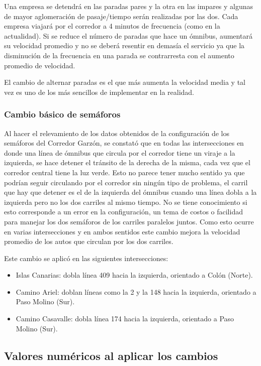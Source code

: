 Una empresa se detendrá en las paradas pares y la otra en las impares y algunas de mayor aglomeración de pasaje/tiempo serán realizadas por las dos. Cada empresa viajará por el corredor a 4 minutos de frecuencia (como en la actualidad). Si se reduce el número de paradas que hace un ómnibus, aumentará su velocidad promedio y no se deberá resentir en demasía el servicio ya que la disminución de la frecuencia en una parada se contrarresta con el aumento promedio de velocidad.

El cambio de alternar paradas es el que más aumenta la velocidad media y tal vez es uno de los más sencillos de implementar en la realidad.



\subsubsection{Cambio básico de semáforos}
Al hacer el relevamiento de los datos obtenidos de la configuración de los semáforos del Corredor Garzón, se constató que en todas las intersecciones en donde una línea de ómnibus que circula por el corredor tiene un viraje a la izquierda, se hace detener el tránsito de la derecha de la misma, cada vez que el corredor central tiene la luz verde. Esto no parece tener mucho sentido ya que podrían seguir circulando por el corredor sin ningún tipo de problema, el carril que hay que detener es el de la izquierda del ómnibus cuando una línea dobla a la izquierda pero no los dos carriles al mismo tiempo. No se tiene conocimiento si esto corresponde a un error en la configuración, un tema de costos o facilidad para manejar los dos semáforos de los carriles paralelos juntos. Como esto ocurre en varias intersecciones y en ambos sentidos este cambio mejora la velocidad promedio de los autos que circulan por los dos carriles.

Este cambio se aplicó en las siguientes intersecciones:
\begin{itemize}
	\item Islas Canarias: dobla línea 409 hacia la izquierda, orientado a Colón (Norte).
	\item Camino Ariel: doblan líneas como la  2 y la 148 hacia la izquierda, orientado a Paso Molino (Sur). 
	\item Camino Casavalle: dobla línea 174 hacia la izquierda, orientado a Paso Molino (Sur). 
\end{itemize}

\subsection{Valores numéricos al aplicar los cambios}

